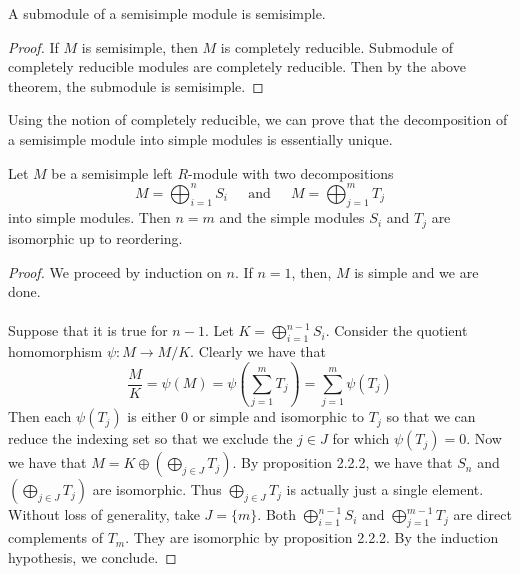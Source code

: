 \documentclass[a4paper]{article}
\begin{document}
\begin{crl}{}{} A submodule of a semisimple module is semisimple. \tcbline
\begin{proof}
If $M$ is semisimple, then $M$ is completely reducible. Submodule of completely reducible modules are completely reducible. Then by the above theorem, the submodule is semisimple. 
\end{proof}
\end{crl}

Using the notion of completely reducible, we can prove that the decomposition of a semisimple module into simple modules is essentially unique. 

\begin{prp}{}{} Let $M$ be a semisimple left $R$-module with two decompositions $$M=\bigoplus_{i=1}^nS_i\;\;\;\;\text{ and }\;\;\;\; M=\bigoplus_{j=1}^mT_j$$ into simple modules. Then $n=m$ and the simple modules $S_i$ and $T_j$ are isomorphic up to reordering. \tcbline
\begin{proof}
We proceed by induction on $n$. If $n=1$, then, $M$ is simple and we are done. \\~\\

Suppose that it is true for $n-1$. Let $K=\bigoplus_{i=1}^{n-1}S_i$. Consider the quotient homomorphism $\psi:M\to M/K$. Clearly we have that $$\frac{M}{K}=\psi(M)=\psi\left(\sum_{j=1}^mT_j\right)=\sum_{j=1}^m\psi(T_j)$$ Then each $\psi(T_j)$ is either $0$ or simple and isomorphic to $T_j$ so that we can reduce the indexing set so that we exclude the $j\in J$ for which $\psi(T_j)=0$. Now we have that $M=K\oplus\left(\bigoplus_{j\in J}T_j\right)$. By proposition 2.2.2, we have that $S_n$ and $\left(\bigoplus_{j\in J}T_j\right)$ are isomorphic. Thus $\bigoplus_{j\in J}T_j$ is actually just a single element. Without loss of generality, take $J=\{m\}$. Both $\bigoplus_{i=1}^{n-1}S_i$ and $\bigoplus_{j=1}^{m-1}T_j$ are direct complements of $T_m$. They are isomorphic by proposition 2.2.2. By the induction hypothesis, we conclude. 
\end{proof}
\end{prp}
\end{document}

